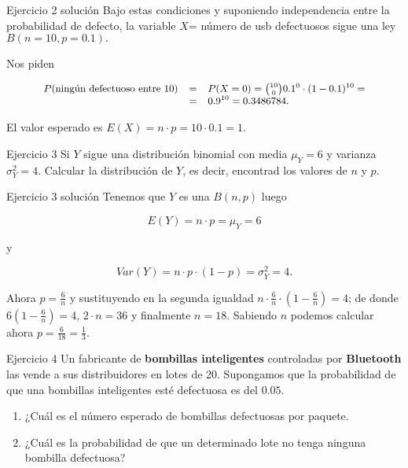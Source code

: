 \documentclass[
  ignorenonframetext,
]{beamer}
\providecommand{\tightlist}{%
  \setlength{\itemsep}{0pt}\setlength{\parskip}{0pt}}
\begin{document}
\begin{frame}{Ejercicio 2 solución}
\protect\hypertarget{ejercicio-2-soluciuxf3n}{}
Bajo estas condiciones y suponiendo independencia entre la probabilidad
de defecto, la variable \(X\)= número de usb defectuosos sigue una ley
\(B(n=10,p=0.1).\)

Nos piden

\[
\small{
\begin{array}{lll}
P(\mbox{ningún defectuoso entre 10})&=& P(X=0)={10\choose 0} 0.1^0\cdot(1-0.1)^{10}=
\\&=&
0.9^{10}=
0.3486784.
\end{array}
}
\]

El valor esperado es \(E(X)=n\cdot p =10\cdot 0.1=1.\)
\end{frame}

\begin{frame}{Ejercicio 3}
\protect\hypertarget{ejercicio-3}{}
Si \(Y\) sigue una distribución binomial con media \(\mu_Y=6\) y
varianza \(\sigma_Y^2=4\). Calcular la distribución de \(Y\), es decir,
encontrad los valores de \(n\) y \(p\).
\end{frame}

\begin{frame}{Ejercicio 3 solución}
\protect\hypertarget{ejercicio-3-soluciuxf3n}{}
Tenemos que \(Y\) es una \(B(n,p)\) luego

\[E(Y)=n\cdot p=\mu_Y=6\]

y

\[Var(Y)=n\cdot p\cdot (1-p)=\sigma_Y^2=4.\]

Ahora \(p=\frac{6}{n}\) y sustituyendo en la segunda igualdad
\(n\cdot \frac{6}{n} \cdot (1-\frac{6}{n})=4\); de donde
\(6 \left(1-\frac6n\right)= 4\), \(2 \cdot n =36\) y finalmente
\(n=18\). Sabiendo \(n\) podemos calcular ahora
\(p=\frac{6}{18}=\frac13.\)
\end{frame}

\begin{frame}{Ejercicio 4}
\protect\hypertarget{ejercicio-4}{}
Un fabricante de \textbf{bombillas inteligentes} controladas por
\textbf{Bluetooth} las vende a sus distribuidores en lotes de 20.
Supongamos que la probabilidad de que una bombillas inteligentes esté
defectuosa es del \(0.05\).

\begin{enumerate}
\tightlist
\item
  ¿Cuál es el número esperado de bombillas defectuosas por paquete.
\item
  ¿Cuál es la probabilidad de que un determinado lote no tenga ninguna
  bombilla defectuosa?
\end{enumerate}
\end{frame}
\end{document}
